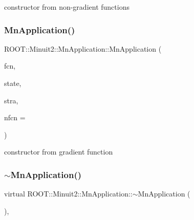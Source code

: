 constructor from non-\/gradient functions 

\mbox{\label{classROOT_1_1Minuit2_1_1MnApplication_a07b6eb3c240c0d2360d466ab1f1a85ec}} 
\subsubsection{\texorpdfstring{MnApplication()}{MnApplication()}\hspace{0.1cm}{\footnotesize\ttfamily [4/4]}}
{\footnotesize\ttfamily R\+O\+O\+T\+::\+Minuit2\+::\+Mn\+Application\+::\+Mn\+Application (\begin{DoxyParamCaption}\item[{const \mbox{\hyperlink{classROOT_1_1Minuit2_1_1FCNGradientBase}{F\+C\+N\+Gradient\+Base}} \&}]{fcn,  }\item[{const \mbox{\hyperlink{classROOT_1_1Minuit2_1_1MnUserParameterState}{Mn\+User\+Parameter\+State}} \&}]{state,  }\item[{const \mbox{\hyperlink{classROOT_1_1Minuit2_1_1MnStrategy}{Mn\+Strategy}} \&}]{stra,  }\item[{unsigned int}]{nfcn = {} }\end{DoxyParamCaption})}



constructor from gradient function 

\mbox{\label{classROOT_1_1Minuit2_1_1MnApplication_ab8f38ab869bbfe082a2dbcefe1fb19de}} 
\subsubsection{\texorpdfstring{$\sim$MnApplication()}{~MnApplication()}\hspace{0.1cm}{\footnotesize\ttfamily [2/2]}}
{\footnotesize\ttfamily virtual R\+O\+O\+T\+::\+Minuit2\+::\+Mn\+Application\+::$\sim$\+Mn\+Application (\begin{DoxyParamCaption}{ }\end{DoxyParamCaption})\hspace{0.3cm}{\ttfamily [inline]}, {\ttfamily [virtual]}}



